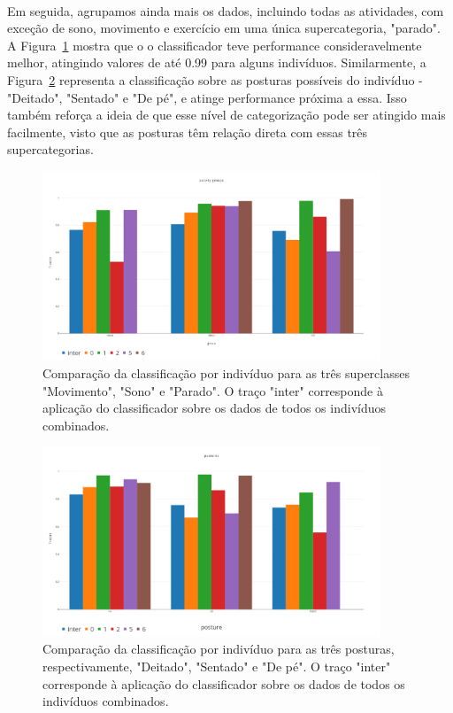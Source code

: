             \paragraph{} Em seguida, agrupamos ainda mais os dados, incluindo todas as atividades,  com exceção de sono, movimento e exercício em uma única supercategoria, "parado". A Figura~\ref{class_g3} mostra que o o classificador teve performance consideravelmente melhor, atingindo valores de até 0.99 para alguns indivíduos. Similarmente, a Figura~\ref{class_posture} representa a classificação sobre as posturas possíveis do indivíduo - "Deitado", "Sentado"  e "De pé", e atinge performance próxima a essa. Isso também reforça a ideia de que esse nível de categorização pode ser atingido mais facilmente, visto que as posturas têm relação direta com essas três supercategorias.
           
            \begin{figure}[h!]
            	\centering
            	\includegraphics[width=0.9\textwidth]{Figures/classif/class_main3_per_user.png}
            	\caption{Comparação da classificação por indivíduo para as três superclasses "Movimento", "Sono" e "Parado". O traço "inter" corresponde à aplicação do classificador sobre os dados de todos os indivíduos combinados.}
                \label{class_g3}
            \end{figure} 
            
            \begin{figure}[h!]
            	\centering
            	\includegraphics[width=0.9\textwidth]{Figures/classif/class_posture_per_user.png}
            	\caption{Comparação da classificação por indivíduo para as três posturas, respectivamente, "Deitado", "Sentado"  e "De pé". O traço "inter" corresponde à aplicação do classificador sobre os dados de todos os indivíduos combinados.}
                \label{class_posture}
            \end{figure} 
            
